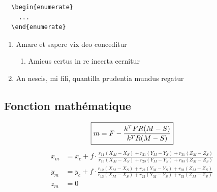 \begin{verbatim}
  \begin{enumerate}
    ...
  \end{enumerate}
\end{verbatim}
\begin{enumerate}
  \raggedright %
  \item Amare et sapere vix deo conceditur
  \begin{enumerate}
      \item Amicus certus in re incerta cernitur
    \end{enumerate} 
  \item An nescis, mi fili, quantilla prudentia mundus regatur
\end{enumerate}




\subsection{Fonction mathématique}

\begin{equation}
    \boxed{m = F - \frac{k^TFR(M-S)}{k^T R(M-S)}}\\
    \label{colin}
\end{equation}
\begin{align*}
    x_m&=x_c+f\cdot\frac{r_{11}(X_M-X_S)+r_{21}(Y_M-Y_S)+r_{31}(Z_M-Z_S)}{r_{13}(X_M-X_S)+r_{23}(Y_M-Y_S)+r_{33}(Z_M-Z_S)}\\
    y_m&=y_c+f\cdot\frac{r_{12}(X_M-X_S)+r_{22}(Y_M-Y_S)+r_{32}(Z_M-Z_S)}{r_{13}(X_M-X_S)+r_{23}(Y_M-Y_S)+r_{33}(Z_M-Z_S)}\\
    z_m&=0
\end{align*}

